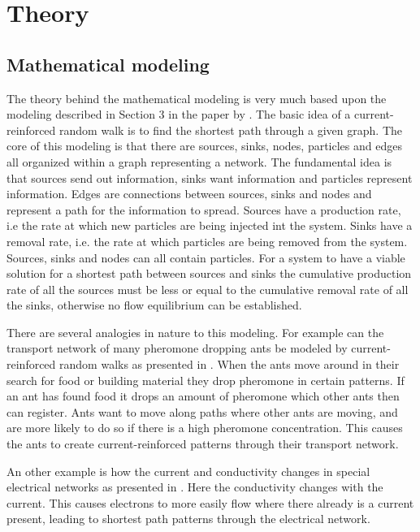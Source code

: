 \section{Theory}
\label{sec:theory}

\subsection{Mathematical modeling}
The theory behind the mathematical modeling is very much based upon the modeling described in Section 3 in the paper by \cite{Current}. The basic idea of a current-reinforced random walk is to find the shortest path through a given graph. The core of this modeling is that there are sources, sinks, nodes, particles and edges all organized within a graph representing a network. The fundamental idea is that sources send out information, sinks want information and particles represent information. Edges are connections between sources, sinks and nodes and represent a path for the information to spread. Sources have a production rate, i.e the rate at which new particles are being injected int the system. Sinks have a removal rate, i.e. the rate at which particles are being removed from the system. Sources, sinks and nodes can all contain particles. For a system to have a viable solution for a shortest path between sources and sinks the cumulative production rate of all the sources  must be less or equal to the cumulative removal rate of all the sinks, otherwise no flow equilibrium can be established.

There are several analogies in nature to this modeling. For example can the transport network of many pheromone dropping ants be modeled by current-reinforced random walks as presented in \cite{Schweitzer1997153}. When the ants move around in their search for food or building material they drop pheromone in certain patterns. If an ant has found food it drops an amount of pheromone which other ants then can register. Ants want to move along paths where other ants are moving, and are more likely to do so if there is a high pheromone concentration. This causes the ants to create current-reinforced patterns through their transport network.

An other example is how the current and conductivity changes in special electrical networks as presented in \cite{Doyle}. Here the conductivity changes with the current. This causes electrons to more easily flow where there already is a current present, leading to shortest path patterns through the electrical network. 

